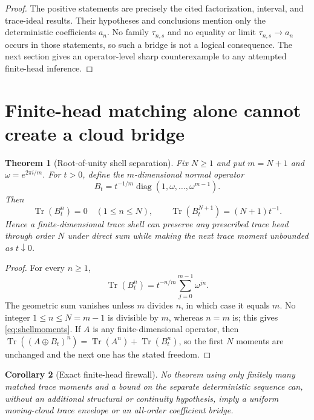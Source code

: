 \documentclass[11pt]{article}
\newtheorem{theorem}{Theorem}[section]
\newtheorem{corollary}[theorem]{Corollary}
\theoremstyle{remark}
\newcommand{\Tr}{\operatorname{Tr}}
\begin{document}
\begin{proof}
The positive statements are precisely the cited factorization, interval, and
trace-ideal results.  Their hypotheses and conclusions mention only the
deterministic coefficients $a_n$.  No family $\tau_{n,s}$ and no equality or
limit $\tau_{n,s}\to a_n$ occurs in those statements, so such a bridge is not
a logical consequence.  The next section gives an operator-level sharp
counterexample to any attempted finite-head inference.
\end{proof}

\section{Finite-head matching alone cannot create a cloud bridge}

\begin{theorem}[Root-of-unity shell separation]\label{thm:shell}
Fix $N\ge1$ and put $m=N+1$ and
$\omega=e^{2\pi i/m}$.  For $t>0$, define the $m$-dimensional normal operator
\begin{equation}
 B_t=t^{-1/m}\operatorname{diag}(1,\omega,\ldots,\omega^{m-1}).
 \label{eq:shell}
\end{equation}
Then
\begin{equation}
 \Tr(B_t^n)=0\quad(1\le n\le N),
 \qquad
 \Tr(B_t^{N+1})=(N+1)t^{-1}.
 \label{eq:shellmoments}
\end{equation}
Hence a finite-dimensional trace shell can preserve any prescribed trace
head through order $N$ under direct sum while making the next trace moment
unbounded as $t\downarrow0$.
\end{theorem}

\begin{proof}
For every $n\ge1$,
\[
 \Tr(B_t^n)=t^{-n/m}\sum_{j=0}^{m-1}\omega^{jn}.
\]
The geometric sum vanishes unless $m$ divides $n$, in which case it equals
$m$.  No integer $1\le n\le N=m-1$ is divisible by $m$, whereas $n=m$ is;
this gives \eqref{eq:shellmoments}.  If $A$ is any finite-dimensional
operator, then $\Tr((A\oplus B_t)^n)=\Tr(A^n)+\Tr(B_t^n)$, so the first $N$
moments are unchanged and the next one has the stated freedom.
\end{proof}

\begin{corollary}[Exact finite-head firewall]
No theorem using only finitely many matched trace moments and a bound on the
separate deterministic sequence can, without an additional structural or
continuity hypothesis, imply a uniform moving-cloud trace envelope or an
all-order coefficient bridge.
\end{corollary}
\end{document}
